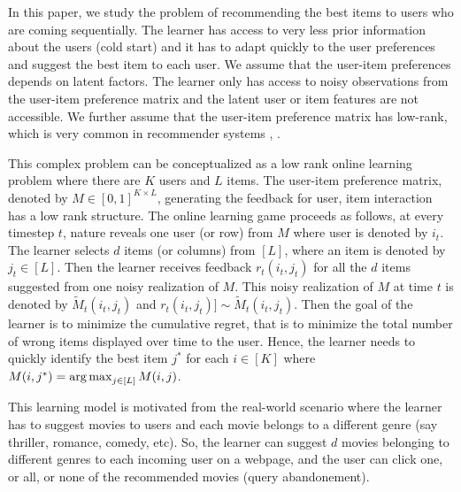 In this paper, we study the problem of recommending the best items to users who are coming sequentially. The learner has access to very less prior information about the users (cold start) and it has to adapt quickly to the user preferences and suggest the best item to each user. We assume that the user-item preferences depends on latent factors. The learner only has access to noisy observations from the user-item preference matrix and the latent user or item features are not accessible. We further assume that the user-item preference matrix has low-rank, which is very common in recommender systems \citep{koren2009matrix}, \citep{ricci2011liorrokach}. %

	This complex problem can be conceptualized as a low rank online learning  problem where there are $K$ users and $L$ items. The user-item preference  matrix, denoted by $M\in [0,1]^{K\times L}$,  generating the feedback for user, item interaction has a low rank structure. The online learning game proceeds as follows, at every timestep $t$,  nature reveals one user (or row) from $M$ where user is denoted by $i_t$. The learner selects $d$ items (or columns) from $[L]$, where an item is denoted by $j_t\in [L]$. Then the learner receives feedback $r_{t}(i_t,j_t)$ for all the $d$ items suggested from one noisy realization of $M$. This noisy realization of $M$ at time $t$ is denoted by $\tilde{M}_t(i_t,j_t)$ and  $r_{t}(i_t,j_t)] \sim \tilde{M}_t(i_t,j_t)$. Then the goal of the learner is to minimize the cumulative regret, that is to minimize the total number of wrong items displayed over time to the user. Hence, the learner needs to quickly identify the best item $j^*$ for each $i\in [K]$ where $M(i,j^*) = \mathop{\rm arg\,max} _{j\in[L]} M(i,j)$. 
	
	This learning model is motivated from the real-world scenario where the learner has  to suggest movies to users and each movie belongs to a different genre (say thriller, romance, comedy, etc). So, the learner can suggest $d$ movies belonging to different genres to each incoming user on a webpage, and the user can click one, or all, or none of the recommended movies (query abandonement).	
	

	
